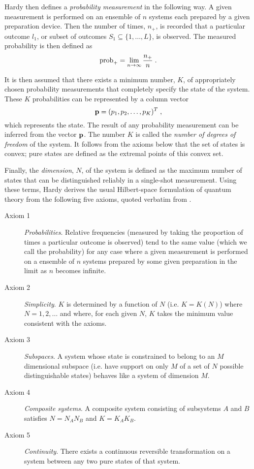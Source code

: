 \documentclass[pra,12pt,tightenlines]{revtex4-2}
\def\p{{\bf p}}
\begin{document}
Hardy then defines a {\it probability measurement\/} in the following way.  A
given measurement is performed on an ensemble of $n$ systems each prepared by
a given preparation device. Then the number of times, $n_+$, is recorded that a
particular outcome $l_1$, or subset of outcomes $S_1\subseteq\{1,\ldots,L\}$,
is observed.  The measured probability is then defined as
\begin{equation}
{\rm prob}_+ = \lim_{n\rightarrow\infty} {n_+\over n} \;.
\end{equation}

It is then assumed that there exists a minimum number, $K$, of appropriately
chosen probability measurements that completely specify the state of the
system. These $K$ probabilities can be represented by a column vector
\begin{equation}
 \p = (p_1,p_2,\ldots,p_K)^T \;,
\end{equation}
which  represents the state. The result of any probability
measurement can be inferred from the vector $\p$. The number $K$ is called
the {\it number of degrees of freedom\/} of the system. It follows from
the axioms below that the set of states is convex; pure states are defined
as the extremal points of this convex set.

Finally, the {\it dimension}, $N$, of the system is defined as the maximum
number of states that can be distinguished reliably in a single-shot
measurement. Using these terms, Hardy derives the usual Hilbert-space 
formulation of quantum theory from the following five axioms, quoted verbatim
from \cite{Hardy-0101}.
\begin{description}
\item[Axiom 1] {\it Probabilities}.  Relative frequencies (measured by
taking the proportion of times a particular outcome is observed)
tend to the same value (which we call the probability) for any case
where a given measurement is performed on a ensemble of $n$ systems
prepared by some given preparation in the limit as $n$ becomes infinite.
\item[Axiom 2] {\it Simplicity}. $K$ is determined by a function of
$N$ (i.e. $K=K(N)$) where $N=1,2,\dots$ and where, for each
given $N$, $K$ takes the minimum value consistent with the axioms.
\item[Axiom 3] {\it Subspaces}. A system whose state is constrained to
belong to an $M$
dimensional subspace (i.e. have support on only $M$ of a set of $N$ possible
distinguishable states) behaves like a system of dimension $M$.
\item[Axiom 4]  {\it Composite systems}. A composite system consisting of
subsystems $A$ and $B$ satisfies $N=N_AN_B$ and $K=K_AK_B$.
\item[Axiom 5] {\it Continuity}. There exists a continuous reversible
transformation on a system between any two pure states of that
system.
\end{description}
\end{document}

